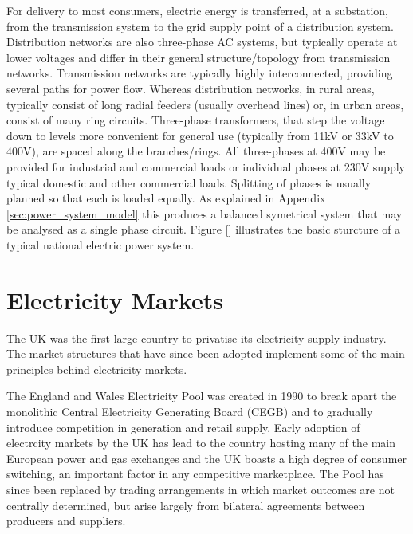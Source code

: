For delivery to most consumers, electric energy is transferred, at a
substation, from the transmission system to the grid supply point of a distribution
system.  Distribution networks are also three-phase AC systems, but
typically operate at lower voltages and differ in their general
structure/topology from transmission networks.  Transmission networks are
typically highly interconnected, providing several paths for power flow.
Whereas distribution networks, in rural areas, typically consist of long radial
feeders (usually overhead lines) or, in urban areas, consist of many ring
circuits.  Three-phase transformers, that step the voltage down to levels
more convenient for general use (typically from 11kV or 33kV to 400V), are spaced along the branches/rings. All three-phases at 400V may be provided for industrial and commercial loads
or individual phases at 230V supply typical domestic and other commercial
loads. Splitting of phases is usually planned so that each is loaded equally.
As explained in Appendix \ref{sec:power_system_model} this produces a balanced
symetrical system that may be analysed as a single phase circuit. Figure []
illustrates the basic sturcture of a typical national electric power system.

\section{Electricity Markets}
The UK was the first large country to privatise its electricity
supply industry.  The market structures that have since been adopted
implement some of the main principles behind electricity markets.

The England and Wales Electricity Pool was created in 1990 to break apart the
monolithic Central Electricity Generating Board (CEGB) and to gradually
introduce competition in generation and retail supply.  Early adoption of
electrcity markets by the UK has lead to the country hosting many of the
main European power and gas exchanges and the UK boasts a high degree
of consumer switching, an important factor in any competitive marketplace. The
Pool has since been replaced by trading arrangements in which market outcomes
are not centrally determined, but arise largely from bilateral agreements
between producers and suppliers.

